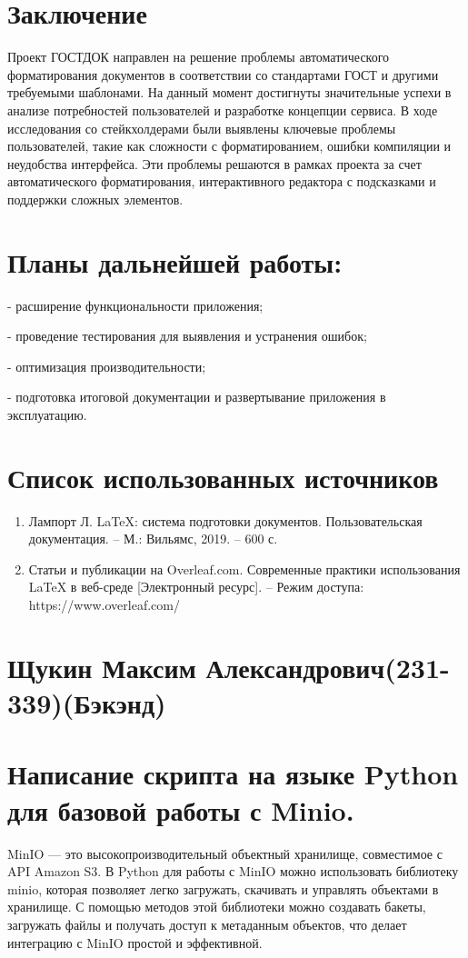 \documentclass[a4paper,12pt]{article}
\begin{document}
\section{Заключение}
Проект ГОСТДОК направлен на решение проблемы автоматического форматирования документов в соответствии со стандартами ГОСТ и другими требуемыми шаблонами. На данный момент достигнуты значительные успехи в анализе потребностей пользователей и разработке концепции сервиса. В ходе исследования со стейкхолдерами были выявлены ключевые проблемы пользователей, такие как сложности с форматированием, ошибки компиляции и неудобства интерфейса. Эти проблемы решаются в рамках проекта за счет автоматического форматирования, интерактивного редактора с подсказками и поддержки сложных элементов.

\section{Планы дальнейшей работы:}
\begin{description}
    \item {- расширение функциональности приложения;}
    \item {- проведение тестирования для выявления и устранения ошибок;}
    \item {- оптимизация производительности;}
    \item {- подготовка итоговой документации и развертывание приложения в эксплуатацию.}
\end{description}  
\section{Список использованных источников}
    \begin{enumerate}
    
    \item Лампорт Л. LaTeX: система подготовки документов. Пользовательская документация. – М.: Вильямс, 2019. – 600 с.
    \item Статьи и публикации на Overleaf.com. Современные практики использования LaTeX в веб-среде [Электронный ресурс]. – Режим доступа: https://www.overleaf.com/

 \end{enumerate}

\newpage
\section*{Щукин Максим Александрович(231-339)(Бэкэнд) }
\section*{Написание скрипта на языке Python для базовой работы с Minio.}
MinIO — это высокопроизводительный объектный хранилище, совместимое с API Amazon S3. В Python для работы с MinIO можно использовать библиотеку minio, которая позволяет легко загружать, скачивать и управлять объектами в хранилище. С помощью методов этой библиотеки можно создавать бакеты, загружать файлы и получать доступ к метаданным объектов, что делает интеграцию с MinIO простой и эффективной.
\end{document}
